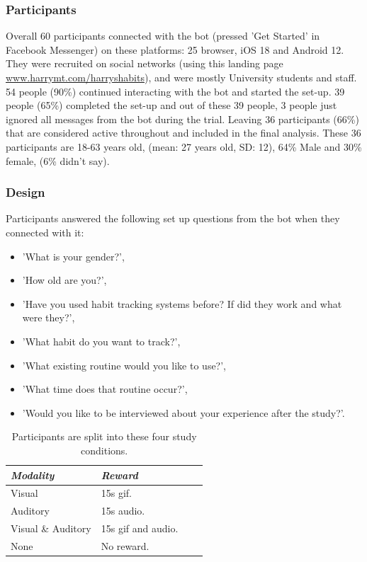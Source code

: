 \documentclass{scaffold/sigchi}
\begin{document}
\subsubsection{Participants}
Overall 60 participants connected with the bot (pressed 'Get Started' in Facebook Messenger) on these platforms: 25 browser, iOS 18 and Android 12. They were recruited on social networks (using this landing page \url{www.harrymt.com/harryshabits}), and were mostly University students and staff.
54 people (90\%) continued interacting with the bot and started the set-up. 39 people (65\%) completed the set-up and out of these 39 people, 3 people just ignored all messages from the bot during the trial. Leaving 36 participants (66\%) that are considered active throughout and included in the final analysis. These 36 participants are 18-63 years old, (mean: 27 years old, SD: 12), 64\% Male and 30\% female, (6\% didn't say). 

\subsubsection{Design}
Participants answered the following set up questions from the bot when they connected with it:
\begin{itemize}
	\item 'What is your gender?',
    \item 'How old are you?',
    \item 'Have you used habit tracking systems before? If did they work and what were they?',
    \item 'What habit do you want to track?',
    \item 'What existing routine would you like to use?',
    \item 'What time does that routine occur?',
    \item 'Would you like to be interviewed about your experience after the study?'.
\end{itemize}

\begin{table}
  \centering
  \begin{tabular}{l l l l}
    \cmidrule(r){3-4}
    {\small\textit{Modality}}
    & {\small \textit{Reward}}\\
    \midrule
    Visual & 15s gif. \\
    Auditory & 15s audio. \\
    Visual \& Auditory & 15s gif and audio. \\
    None & No reward. \\
  \end{tabular}
  \caption{Participants are split into these four study conditions.}~\label{tab:precise_rewards}
\end{table}
\end{document}
